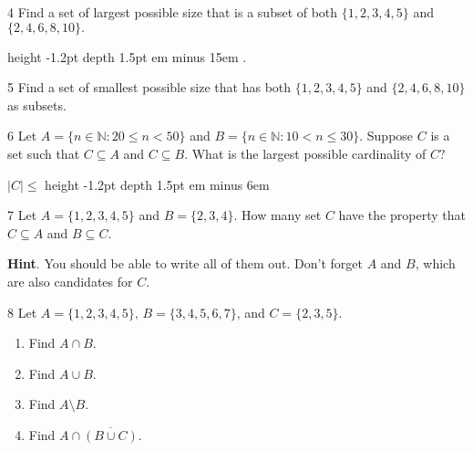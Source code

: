 \documentclass[11pt,]{book}
\newcommand{\fillin}[1]{\leavevmode\leaders\vrule height -1.2pt depth 1.5pt \hskip #1em minus #1em \null}
\theoremstyle{ptxplainnotitle}
\theoremstyle{ptxplaintitle}
\theoremstyle{ptxdefinitionnotitle}
\theoremstyle{ptxdefinitiontitle}
\theoremstyle{ptxdefinitionnotitle}
\theoremstyle{ptxdefinitiontitle}
\theoremstyle{ptxdefinitionnotitle}
\theoremstyle{ptxdefinitiontitle}
\theoremstyle{ptxdefinitiontitlenonumber}
\theoremstyle{ptxdefinitiontitlenonumber}
\numberwithin{equation}{chapter}
\newcommand{\N}{\mathbb N}
\newcommand{\st}{:}
\newcommand{\card}[1]{\left| #1 \right|}
\newcommand{\lt}{<}
\begin{document}
\begin{divisionexercise}{4}\hypertarget{exercise-81}{}
\hypertarget{p-824}{}%
Find a set of largest possible size that is a subset of both \(\{1, 2, 3, 4, 5\}\) and \(\{2, 4, 6, 8,10\}\text{.}\)%
\par
\hypertarget{p-825}{}%
 \fillin{15}.%
\end{divisionexercise}%
\begin{divisionexercise}{5}\hypertarget{exercise-82}{}
\hypertarget{p-830}{}%
Find a set of smallest possible size that has both \(\{1,2,3,4,5\}\) and \(\{2,4,6,8,10\}\) as subsets.%
\end{divisionexercise}%
\begin{divisionexercise}{6}\hypertarget{exercise-83}{}
\hypertarget{p-836}{}%
Let \(A = \{n \in \N \st 20 \le n \lt 50\}\) and \(B = \{n \in \N \st 10 \lt n \le 30\}\text{.}\) Suppose \(C\) is a set such that \(C \subseteq A\) and \(C \subseteq B\text{.}\)  What is the largest possible cardinality of \(C\text{?}\)%
\par
\hypertarget{p-837}{}%
\(\card{C} \le\) \fillin{6}%
\end{divisionexercise}%
\begin{divisionexercise}{7}\hypertarget{exercise-84}{}
\hypertarget{p-843}{}%
Let \(A = \{1,2,3,4,5\}\) and \(B = \{2, 3, 4\}\text{.}\)  How many set \(C\) have the property that \(C \subseteq A\) and \(B \subseteq C\text{.}\)%
\par\smallskip%
\noindent\textbf{Hint}.\hypertarget{hint-6}{}\quad%
\hypertarget{p-845}{}%
You should be able to write all of them out.  Don't forget \(A\) and \(B\text{,}\) which are also candidates for \(C\text{.}\)%
\end{divisionexercise}%
\begin{divisionexercise}{8}\hypertarget{exercise-85}{}
\hypertarget{p-857}{}%
Let \(A = \{1,2,3,4,5\}\text{,}\) \(B = \{3,4,5,6,7\}\text{,}\) and \(C = \{2,3,5\}\text{.}\) \leavevmode%
\begin{enumerate}[label=\alph*.]
\item\hypertarget{li-382}{}\hypertarget{p-858}{}%
Find \(A \cap B\text{.}\)%
\item\hypertarget{li-383}{}\hypertarget{p-860}{}%
Find \(A \cup B\text{.}\)%
\item\hypertarget{li-384}{}\hypertarget{p-862}{}%
Find \(A \setminus B\text{.}\)%
\item\hypertarget{li-385}{}\hypertarget{p-864}{}%
Find \(A \cap \overline{(B \cup C)}\text{.}\)%
\end{enumerate}
%
\end{divisionexercise}%
\end{document}
